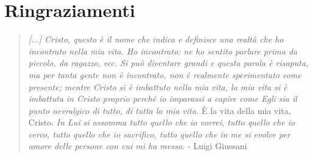 \chapter*{Ringraziamenti}

\begin{quote}
    \textit{[...] Cristo, questo è il nome che indica e definisce una realtà che ho incontrato nella mia vita. Ho incontrato: ne ho sentito parlare prima da piccolo, da ragazzo, ecc. Si può diventare grandi e questa parola è risaputa, ma per tanta gente non è incontrato, non è realmente sperimentato come presente; mentre Cristo si è imbattuto nella mia vita, la mia vita si è imbattuta in Cristo proprio perché io imparassi a capire come Egli sia il punto nevralgico di tutto, di tutta la mia vita. }È la vita della mia vita, Cristo.\textit{ In Lui si assomma tutto quello che io vorrei, tutto quello che io cerco, tutto quello che io sacrifico, tutto quello che in me si evolve per amore delle persone con cui mi ha messo.} - Luigi Giussani %
\end{quote}